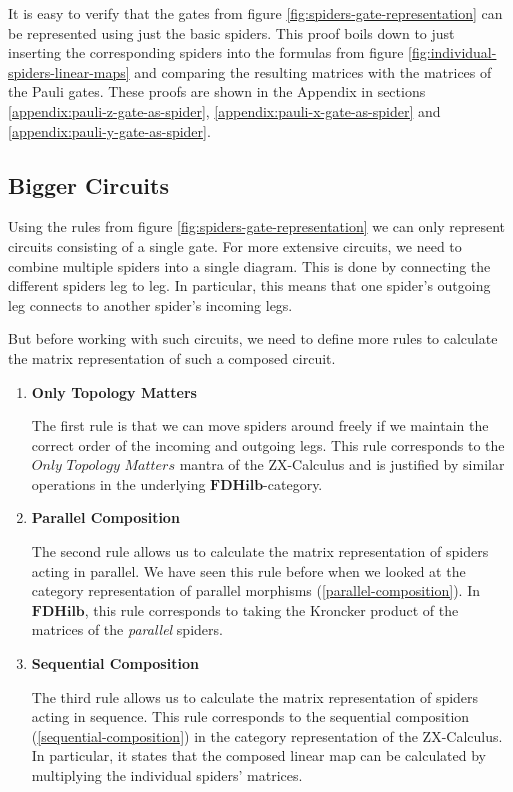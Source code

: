 It is easy to verify that the gates from figure \ref{fig:spiders-gate-representation} can be represented using just the basic spiders. This proof boils down to just inserting the corresponding spiders into the formulas from figure \ref{fig:individual-spiders-linear-maps} and comparing the resulting matrices with the matrices of the Pauli gates.
These proofs are shown in the Appendix in sections \ref{appendix:pauli-z-gate-as-spider}, \ref{appendix:pauli-x-gate-as-spider} and \ref{appendix:pauli-y-gate-as-spider}.

\subsection{Bigger Circuits}

Using the rules from figure \ref{fig:spiders-gate-representation} we can only represent circuits consisting of a single gate. For more extensive circuits, we need to combine multiple spiders into a single diagram. This is done by connecting the different spiders leg to leg. In particular, this means that one spider's outgoing leg connects to another spider's incoming legs.

But before working with such circuits, we need to define more rules to calculate the matrix representation of such a composed circuit.

\begin{enumerate}

    \item \textbf{Only Topology Matters}

          The first rule is that we can move spiders around freely if we maintain the correct order of the incoming and outgoing legs. This rule corresponds to the $\textit{Only Topology Matters}$ mantra of the ZX-Calculus and is justified by similar operations in the underlying $\mathbf{FDHilb}$-category.

    \item \textbf{Parallel Composition}

          The second rule allows us to calculate the matrix representation of spiders acting in parallel. We have seen this rule before when we looked at the category representation of parallel morphisms (\ref{parallel-composition}). In $\mathbf{FDHilb}$, this rule corresponds to taking the Kroncker product of the matrices of the \textit{parallel} spiders.

    \item \textbf{Sequential Composition}

          The third rule allows us to calculate the matrix representation of spiders acting in sequence. This rule corresponds to the sequential composition (\ref{sequential-composition}) in the category representation of the ZX-Calculus. In particular, it states that the composed linear map can be calculated by multiplying the individual spiders' matrices.
\end{enumerate}

